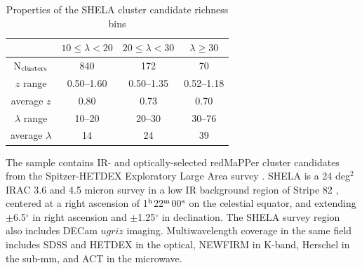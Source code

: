 \documentclass[a4paper,fleqn,usenatbib]{mnras}
\begin{document}
\begin{table}
  \centering
  \caption{Properties of the SHELA cluster candidate richness bins}
  \begin{tabular}{|*{4}{c|}}
    \hline
    & $10 \leq \lambda < 20$ & $20 \leq \lambda < 30$ & $\lambda \geq 30$ \\ \hline
    
    N$_{\rm clusters}$ & 840 & 172 & 70 \\ \hline
     
    $z$ range & 0.50--1.60 & 0.50--1.35 & 0.52--1.18  \\ \hline
    
    average $z$ & 0.80 & 0.73 & 0.70 \\ \hline
    
    $\lambda$ range & 10--20 & 20--30 & 30--76 \\ \hline %
    
    average $\lambda$ & 14 & 24 & 39 \\ \hline
    
    \end{tabular}
\label{table:sampleinfo}
\end{table}


The sample contains IR- and optically-selected redMaPPer cluster candidates from the Spitzer-HETDEX Exploratory Large Area survey  \citep[SHELA]{2016ApJS..224...28P}. 
SHELA is a 24 deg$^2$ IRAC 3.6 and 4.5 micron survey in a low IR background region of Stripe 82 \citep{2000AJ....120.1579Y}, centered at a right ascension of 1$^{\rm h}$22$^{\rm m}$00$^{\rm s}$ on the celestial equator, and extending $\pm$6.5$^{\circ}$ in right ascension and $\pm$1.25$^{\circ}$ in declination. 
The SHELA survey region also includes DECam $ugriz$ imaging. Multiwavelength coverage in the same field includes SDSS and HETDEX in the optical, NEWFIRM in K-band, Herschel in the sub-mm, and ACT in the microwave. 
\end{document}
